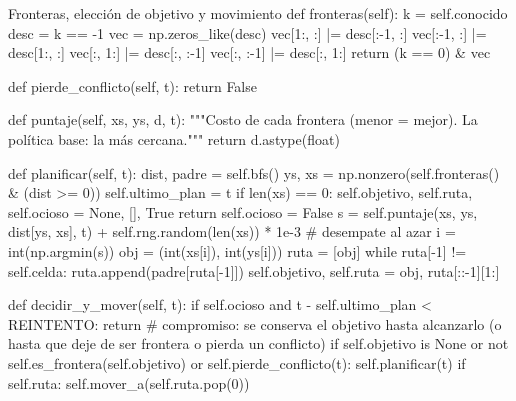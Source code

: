 \documentclass[11pt,letterpaper]{article}
\begin{document}
\begin{codigo}[label=cod:plan]{Fronteras, elección de objetivo y movimiento}
    def fronteras(self):
        k = self.conocido
        desc = k == -1
        vec = np.zeros_like(desc)
        vec[1:, :] |= desc[:-1, :]
        vec[:-1, :] |= desc[1:, :]
        vec[:, 1:] |= desc[:, :-1]
        vec[:, :-1] |= desc[:, 1:]
        return (k == 0) & vec

    def pierde_conflicto(self, t):
        return False

    def puntaje(self, xs, ys, d, t):
        """Costo de cada frontera (menor = mejor). La política base: la más cercana."""
        return d.astype(float)

    def planificar(self, t):
        dist, padre = self.bfs()
        ys, xs = np.nonzero(self.fronteras() & (dist >= 0))
        self.ultimo_plan = t
        if len(xs) == 0:
            self.objetivo, self.ruta, self.ocioso = None, [], True
            return
        self.ocioso = False
        s = self.puntaje(xs, ys, dist[ys, xs], t) + self.rng.random(len(xs)) * 1e-3     # desempate al azar
        i = int(np.argmin(s))
        obj = (int(xs[i]), int(ys[i]))
        ruta = [obj]
        while ruta[-1] != self.celda:
            ruta.append(padre[ruta[-1]])
        self.objetivo, self.ruta = obj, ruta[::-1][1:]

    def decidir_y_mover(self, t):
        if self.ocioso and t - self.ultimo_plan < REINTENTO:
            return
        # compromiso: se conserva el objetivo hasta alcanzarlo (o hasta que deje de ser frontera o pierda un conflicto)
        if self.objetivo is None or not self.es_frontera(self.objetivo) or self.pierde_conflicto(t):
            self.planificar(t)
        if self.ruta:
            self.mover_a(self.ruta.pop(0))
\end{codigo}
\end{document}

